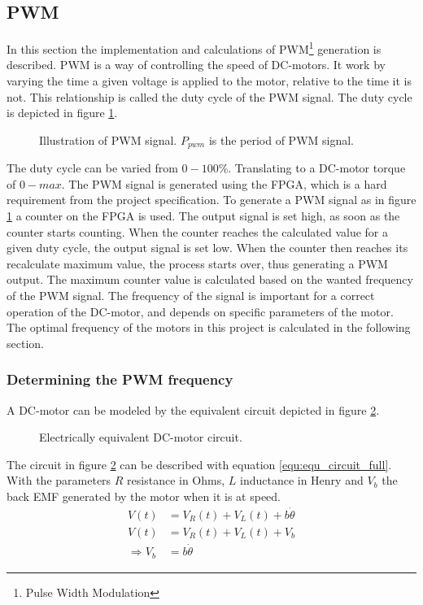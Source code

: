 \documentclass[../../../Main]{subfiles}
\begin{document}
\subsection{PWM}
In this section the implementation and calculations of PWM\footnote{Pulse Width Modulation} generation is described. PWM is a way of controlling the speed of DC-motors. It work by varying the time a given voltage is applied to the motor, relative to the time it is not. This relationship is called the duty cycle of the PWM signal. The duty cycle is depicted in figure \ref{fig:pwm}.

\begin{figure}[h]
  
  \caption{Illustration of PWM signal. $P_{pwm}$ is the period of PWM signal.}
  \label{fig:pwm}
\end{figure}

The duty cycle can be varied from $0 - 100\%$. Translating to a DC-motor torque of $0 - max$.
The PWM signal is generated using the FPGA, which is a hard requirement from the project  specification. To generate a PWM signal as in figure \ref{fig:pwm} a counter on the FPGA  is used.
The output signal is set high, as soon as the counter starts counting. When the counter reaches the calculated value for a given duty cycle, the output signal is set low. When the counter then reaches its recalculate maximum value, the process starts over, thus generating a PWM output. The maximum counter value is calculated based on the wanted frequency of the PWM signal. The frequency of the signal is important for a correct operation of the DC-motor, and depends on specific parameters of the motor. The optimal frequency of the motors in this project is calculated in the following section.
\newpage
\subsubsection{Determining the PWM frequency}

A DC-motor can be modeled by the equivalent circuit depicted in figure \ref{fig:electrical_equ}.

\begin{figure}[ht]
	\center
    \def\svgwidth{0.5\textwidth}
	
	\caption{Electrically equivalent DC-motor circuit.}
  \label{fig:electrical_equ}
\end{figure}
The circuit in figure \ref{fig:electrical_equ} can be described with equation \eqref{equ:equ_circuit_full}. With the parameters $R$ resistance in Ohms, $L$ inductance in Henry and $V_b$ the back EMF generated by the motor when it is at speed.
\begin{align}
	V(t) &= V_R(t) + V_L(t) + b\dot{\theta}\\
 \label{equ:equ_circuit_full}
	V(t) &= V_R(t) + V_L(t) + V_b\\
	\Rightarrow V_b &= b\dot{\theta}
\end{align}
\end{document}
